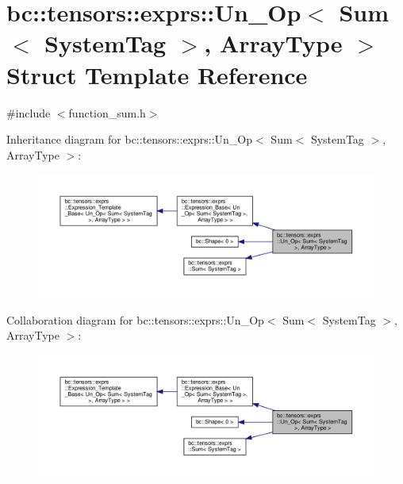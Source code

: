 \hypertarget{structbc_1_1tensors_1_1exprs_1_1Un__Op_3_01Sum_3_01SystemTag_01_4_00_01ArrayType_01_4}{}\section{bc\+:\+:tensors\+:\+:exprs\+:\+:Un\+\_\+\+Op$<$ Sum$<$ System\+Tag $>$, Array\+Type $>$ Struct Template Reference}
\label{structbc_1_1tensors_1_1exprs_1_1Un__Op_3_01Sum_3_01SystemTag_01_4_00_01ArrayType_01_4}


{\ttfamily \#include $<$function\+\_\+sum.\+h$>$}



Inheritance diagram for bc\+:\+:tensors\+:\+:exprs\+:\+:Un\+\_\+\+Op$<$ Sum$<$ System\+Tag $>$, Array\+Type $>$\+:\nopagebreak
\begin{figure}[H]
\begin{center}
\leavevmode
\includegraphics[width=350pt]{structbc_1_1tensors_1_1exprs_1_1Un__Op_3_01Sum_3_01SystemTag_01_4_00_01ArrayType_01_4__inherit__graph}
\end{center}
\end{figure}


Collaboration diagram for bc\+:\+:tensors\+:\+:exprs\+:\+:Un\+\_\+\+Op$<$ Sum$<$ System\+Tag $>$, Array\+Type $>$\+:\nopagebreak
\begin{figure}[H]
\begin{center}
\leavevmode
\includegraphics[width=350pt]{structbc_1_1tensors_1_1exprs_1_1Un__Op_3_01Sum_3_01SystemTag_01_4_00_01ArrayType_01_4__coll__graph}
\end{center}
\end{figure}
